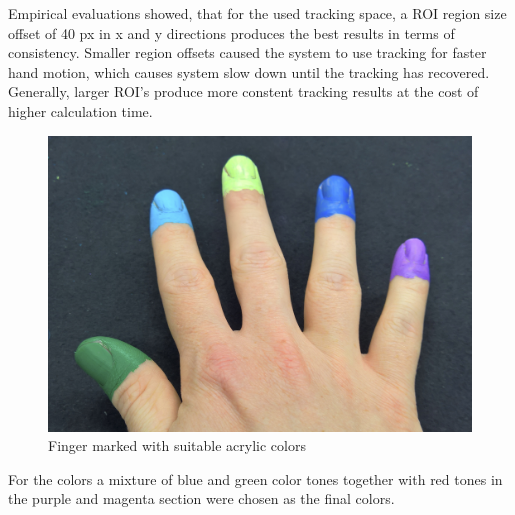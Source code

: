 Empirical evaluations showed, that for the used tracking space, a ROI region size offset of 40 px in x and y directions produces the best results in terms of consistency. Smaller region offsets caused the system to use tracking for faster hand motion, which causes system slow down until the tracking has recovered. Generally, larger ROI's produce more constent tracking results at the cost of higher calculation time.
\begin{figure}[H]
\includegraphics[scale=0.05]{images/final_finger_markers.jpg}
\centering
\caption{Finger marked with suitable acrylic colors}
\label{img:final_markers}
\end{figure}
For the colors a mixture of blue and green color tones together with red tones in the purple and magenta section were chosen as the final colors.
